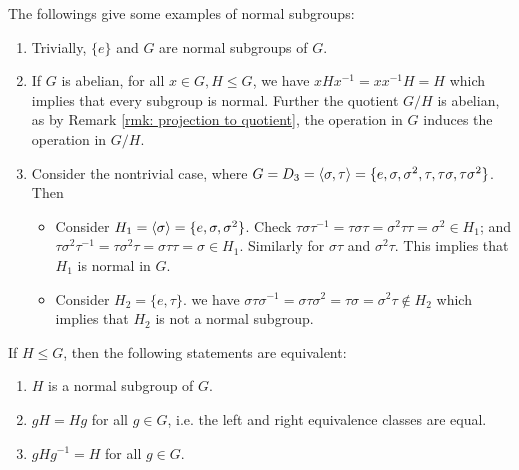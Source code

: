 \begin{example}
    The followings give some examples of normal subgroups:
    \begin{enumerate}
        \item Trivially, $\{e\}$ and $G$ are normal subgroups of $G$.
        \item If $G$ is abelian, for all $x \in G, H \leq G$, we have $xHx^{-1} = xx^{-1}H = H$ which implies that every subgroup is normal. Further the quotient $G/H$ is abelian, as by Remark \ref{rmk: projection to quotient}, the operation in $G$ induces the operation in $G/H$.
        \item Consider the nontrivial case, where $G = D_3 = \left\langle \sigma, \tau \right\rangle = \{e, \sigma, \sigma^2, \tau, \tau\sigma, \tau\sigma^2\}$. Then
            \begin{itemize}
                \item Consider $H_1 = \left\langle \sigma \right\rangle = \{e, \sigma, \sigma^2\}$. Check $\tau\sigma\tau^{-1} = \tau\sigma\tau = \sigma^2\tau\tau = \sigma^2 \in H_1$; and $\tau\sigma^2\tau^{-1} = \tau\sigma^2\tau = \sigma\tau\tau = \sigma \in H_1$. Similarly for $\sigma\tau$ and $\sigma^2\tau$. This implies that $H_1$ is normal in $G$.
                \item Consider $H_2 = \{ e, \tau \}$. we have $\sigma\tau\sigma^{-1} = \sigma\tau\sigma^2 = \tau\sigma = \sigma^2 \tau \notin H_2$ which implies that $H_2$ is not a normal subgroup.
            \end{itemize}
    \end{enumerate}
\end{example}

\begin{proposition}\label{prop: equivalence definition of normal subgroup}
    If $H \leq G$, then the following statements are equivalent:
    \begin{enumerate}[label=\arabic*)]
        \item $H$ is a normal subgroup of $G$.
        \item $gH = Hg$ for all $g \in G$, i.e. the left and right equivalence classes are equal.
        \item $gHg^{-1} = H$ for all $g \in G$.
    \end{enumerate}
\end{proposition}

